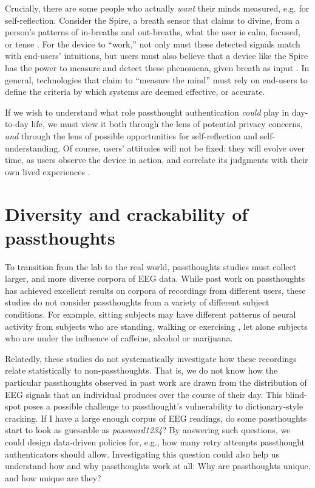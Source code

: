 \documentclass[sigconf]{acmart}
\begin{document}
Crucially, there are some people who actually \emph{want} their minds measured, e.g. for self-reflection. Consider the Spire, a breath sensor that claims to divine, from a person's patterns of in-breaths and out-breaths, what the user is calm, focused, or tense \cite{SpireInc}. 
For the device to ``work,'' not only must these detected signals match with end-users' intuitions, but users must also believe that a device like the Spire has the power to measure and detect these phenomena, given breath as input \cite{Ali2014a}. 
In general, technologies that claim to ``measure the mind'' must rely on end-users to define the criteria by which systems are deemed effective, or accurate. 

If we wish to understand what role passthought authentication \emph{could} play in day-to-day life,
we must view it both through the lens of potential privacy concerns, \emph{and} through the lens of possible opportunities for self-reflection and self-understanding. 
Of course, users' attitudes will not be fixed: they will evolve over time, as users observe the device in action, and correlate its judgments with their own lived experiences \cite{Nafus2016}.

\section{Diversity and crackability of passthoughts}
\label{sec:orga75c464}

To transition from the lab to the real world,
passthoughts studies must collect larger, and more diverse corpora of EEG data.
While past work on passthoughts has achieved excellent results on corpora of recordings from different users, 
these studies do not consider passthoughts from a variety of different subject conditions.
For example, sitting subjects may have different patterns of neural activity from subjects who are standing, walking or exercising \cite{Thibault2016a},
let alone subjects who are under the influence of caffeine, alcohol or marijuana.

Relatedly, these studies do not systematically investigate how these recordings relate statistically to non-passthoughts.
That is, we do not know how the particular passthoughts observed in past work are drawn from the distribution of EEG signals that an individual produces over the course of their day.
This blind-spot poses a possible challenge to passthought's vulnerability to dictionary-style cracking.
If I have a large enough corpus of EEG readings, do some passthoughts start to look as guessable as \emph{password1234}?
By answering such questions, we could design data-driven policies for, e.g., how many retry attempts passthought authenticators should allow.
Investigating this question could also help us understand how and why passthoughts work at all: Why are passthoughts unique, and how unique are they?
\end{document}
